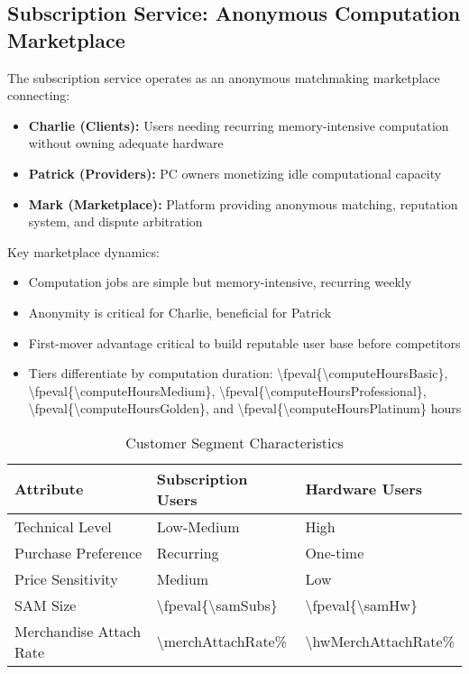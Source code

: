 \documentclass[11pt]{article}
\newcommand{\numint}[1]{\num[round-precision=0]{\fpeval{#1}}}
\begin{document}
\subsection{Subscription Service: Anonymous Computation Marketplace}
The subscription service operates as an anonymous matchmaking marketplace connecting:
\begin{itemize}
  \item \textbf{Charlie (Clients):} Users needing recurring memory-intensive computation without owning adequate hardware
  \item \textbf{Patrick (Providers):} PC owners monetizing idle computational capacity
  \item \textbf{Mark (Marketplace):} Platform providing anonymous matching, reputation system, and dispute arbitration
\end{itemize}

Key marketplace dynamics:
\begin{itemize}
  \item Computation jobs are simple but memory-intensive, recurring weekly
  \item Anonymity is critical for Charlie, beneficial for Patrick
  \item First-mover advantage critical to build reputable user base before competitors
  \item Tiers differentiate by computation duration: \numint{\computeHoursBasic}, \numint{\computeHoursMedium}, \numint{\computeHoursProfessional}, \numint{\computeHoursGolden}, and \numint{\computeHoursPlatinum} hours
\end{itemize}

\begin{table}[H]
\centering
\caption{Customer Segment Characteristics}
\begin{tabularx}{\linewidth}{l X X}
\toprule
Attribute & Subscription Users & Hardware Users \\\midrule
Technical Level & Low-Medium & High \\
Purchase Preference & Recurring & One-time \\
Price Sensitivity & Medium & Low \\
SAM Size & \numint{\samSubs}\cite{chainalysis2024,triple2023} & \numint{\samHw}\cite{chainalysis2024,triple2023} \\
Merchandise Attach Rate & \num{\merchAttachRate}\%\cite{shopify2024} & \num{\hwMerchAttachRate}\%\cite{shopify2024} \\
\bottomrule
\end{tabularx}
\end{table}
\end{document}
